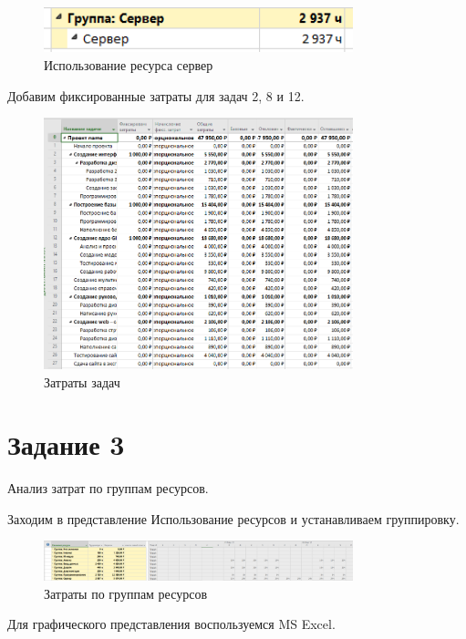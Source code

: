 \begin{figure}[H]
	\centering
	\includegraphics[width=0.8\textwidth]{img/content/server.png}
	\caption{Использование ресурса сервер}
\end{figure}

Добавим фиксированные затраты для задач 2, 8 и 12.

\begin{figure}[H]
	\centering
	\includegraphics[width=0.8\textwidth]{img/content/money.png}
	\caption{Затраты задач}
\end{figure}

\section{Задание 3}

Анализ затрат по группам ресурсов.

Заходим в представление Использование ресурсов и устанавливаем группировку.

\begin{figure}[H]
	\centering
	\includegraphics[width=0.8\textwidth]{img/content/groups.png}
	\caption{Затраты по группам ресурсов}
\end{figure}

Для графического представления воспользуемся MS Excel.

